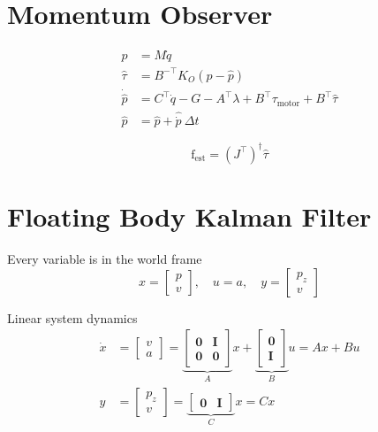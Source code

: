 \documentclass[11pt]{article}
\newcommand{\T}{^\top}          %
\newcommand{\zeros}{\mathbf 0}
\begin{document}
\section*{Momentum Observer}

\begin{align*}
  p &= M \dot{q}\\
  \hat{\tau} &= B^{-\top} K_O(p - \hat{p})\\
  \dot{\hat{p}} &= C\T \dot{q} - G - A\T \lambda + B\T \tau_{\text{motor}} + B\T \hat{\tau}\\
  \hat{p} &= \hat{p} + \hat{\dot{p}} \ \Delta t
\end{align*}

\[
\mathrm{f}_{\text{est}} = ({J}\T)^\dagger \hat{\tau}
\]

\clearpage

\section*{Floating Body Kalman Filter}

Every variable is in the world frame
\[
x = 
\begin{bmatrix}
  p\\v
\end{bmatrix},
\quad u = a,
\quad y = 
\begin{bmatrix}
  p_z\\v
\end{bmatrix}
\]

Linear system dynamics
\begin{align*}
\dot{x} &=
\begin{bmatrix}
  v \\ a
\end{bmatrix} 
= 
\underbrace{
  \begin{bmatrix}
    \zeros & \bm I\\
    \zeros & \zeros
  \end{bmatrix}
}_{A}
x +
\underbrace{
\begin{bmatrix}
  \zeros\\ \bm I
\end{bmatrix}  
}_{B}
u
= A x + B u\\
y &= 
\begin{bmatrix}
  p_z\\v
\end{bmatrix}
= 
\underbrace{
\begin{bmatrix}
  \zeros & \bm I
\end{bmatrix}
}_{C}
x
= C x
\end{align*}
\end{document}
